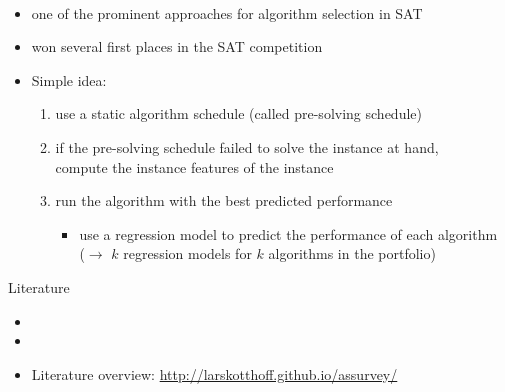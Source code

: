 % 
% 
\begin{frame}[c]{\satzilla{}~}

\begin{itemize}
  \item one of the prominent approaches for algorithm selection in SAT
  \item won several first places in the SAT competition
  \medskip
  \item Simple idea:
  \begin{enumerate}
    \item use a static algorithm schedule (called pre-solving schedule)
    \item if the pre-solving schedule failed to solve the instance at hand,\\
    		compute the instance features of the instance
    \item run the algorithm with the best predicted performance
    	  \begin{itemize}
    	    \item use a regression model to predict the performance of each algorithm\\
    	    ($\to$ $k$ regression models for $k$ algorithms in the portfolio)
    	  \end{itemize}
  \end{enumerate}
\end{itemize}

\end{frame}
\begin{frame}[c]{Literature}

\begin{itemize}
  \item {}
  \item {}
  \item Literature overview: \url{http://larskotthoff.github.io/assurvey/}
\end{itemize}


\end{frame}
